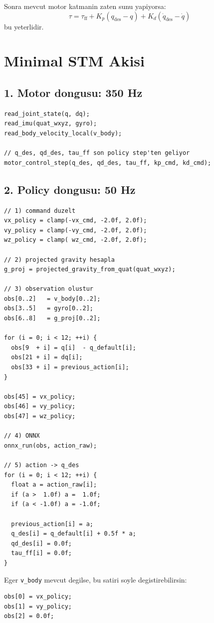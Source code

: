 \documentclass[11pt,a4paper]{article}
\begin{document}
\noindent
Sonra mevcut motor katmanin zaten sunu yapiyorsa:
\[
\tau = \tau_{\mathrm{ff}} + K_p(q_{\mathrm{des}} - q) + K_d(\dot q_{\mathrm{des}} - \dot q)
\]
bu yeterlidir.

\section{Minimal STM Akisi}
\subsection*{1. Motor dongusu: 350 Hz}
\begin{lstlisting}
read_joint_state(q, dq);
read_imu(quat_wxyz, gyro);
read_body_velocity_local(v_body);

// q_des, qd_des, tau_ff son policy step'ten geliyor
motor_control_step(q_des, qd_des, tau_ff, kp_cmd, kd_cmd);
\end{lstlisting}

\subsection*{2. Policy dongusu: 50 Hz}
\begin{lstlisting}
// 1) command duzelt
vx_policy = clamp(-vx_cmd, -2.0f, 2.0f);
vy_policy = clamp(-vy_cmd, -2.0f, 2.0f);
wz_policy = clamp( wz_cmd, -2.0f, 2.0f);

// 2) projected gravity hesapla
g_proj = projected_gravity_from_quat(quat_wxyz);

// 3) observation olustur
obs[0..2]   = v_body[0..2];
obs[3..5]   = gyro[0..2];
obs[6..8]   = g_proj[0..2];

for (i = 0; i < 12; ++i) {
  obs[9  + i] = q[i]  - q_default[i];
  obs[21 + i] = dq[i];
  obs[33 + i] = previous_action[i];
}

obs[45] = vx_policy;
obs[46] = vy_policy;
obs[47] = wz_policy;

// 4) ONNX
onnx_run(obs, action_raw);

// 5) action -> q_des
for (i = 0; i < 12; ++i) {
  float a = action_raw[i];
  if (a >  1.0f) a =  1.0f;
  if (a < -1.0f) a = -1.0f;

  previous_action[i] = a;
  q_des[i] = q_default[i] + 0.5f * a;
  qd_des[i] = 0.0f;
  tau_ff[i] = 0.0f;
}
\end{lstlisting}

\noindent
Eger \texttt{v\_body} mevcut degilse, bu satiri soyle degistirebilirsin:

\begin{lstlisting}
obs[0] = vx_policy;
obs[1] = vy_policy;
obs[2] = 0.0f;
\end{lstlisting}
\end{document}
